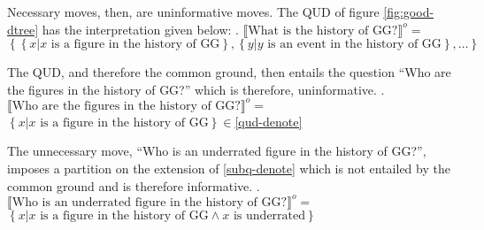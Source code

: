 \documentclass[letterpaper]{article}
\begin{document}
Necessary moves, then, are uninformative moves.
The QUD of figure \ref{fig:good-dtree} has the interpretation given below:
\ex.\label{qud-denote} $\llbracket\text{What is the history of GG?}\rrbracket^o =$\\
$\left\{ \left\{ x | x \text{ is a figure in the history of GG} \right\}, \left\{ y | y \text{ is an event in the history of GG} \right\},\dots \right\}$

The QUD, and therefore the common ground, then entails the question ``Who are the figures in the history of GG?'' which is therefore, uninformative.
\ex.\label{subq-denote} $\llbracket\text{Who are the figures in the history of GG?}\rrbracket^o =$\\
$\left\{ x | x \text{ is a figure in the history of GG} \right\} \in $\ref{qud-denote}

The unnecessary move, ``Who is an underrated figure in the history of GG?'', imposes a partition on the extension of \ref{subq-denote} which is not entailed by the common ground and is therefore informative.
\ex.\label{ct-denote} $\llbracket\text{Who is an underrated figure in the history of GG?}\rrbracket^o =$\\
$\left\{ x | x \text{ is a figure in the history of GG} \wedge x \text{ is underrated} \right\}$
\end{document}
